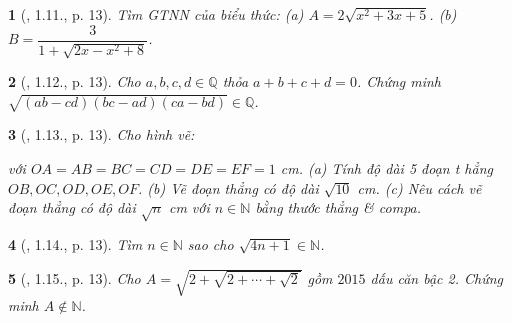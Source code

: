 \documentclass{article}
\newtheorem{baitoan}{}%
\begin{document}
\begin{baitoan}[\cite{Binh_boi_duong_Toan_9_tap_1}, 1.11., p. 13]
	Tìm {\rm GTNN} của biểu thức: (a) $A = 2\sqrt{x^2 + 3x + 5}$. (b) $B = \dfrac{3}{1 + \sqrt{2x - x^2 + 8}}$.
\end{baitoan}

\begin{baitoan}[\cite{Binh_boi_duong_Toan_9_tap_1}, 1.12., p. 13]
	Cho $a,b,c,d\in\mathbb{Q}$ thỏa $a + b + c + d = 0$. Chứng minh $\sqrt{(ab - cd)(bc - ad)(ca - bd)}\in\mathbb{Q}$.
\end{baitoan}

\begin{baitoan}[\cite{Binh_boi_duong_Toan_9_tap_1}, 1.13., p. 13]
	Cho hình vẽ:
	\begin{center}
	\end{center}
	với $OA = AB = BC = CD = DE = EF = 1$ {\rm cm}. (a) Tính độ dài 5 đoạn t hẳng $OB,OC,OD,OE,OF$. (b) Vẽ đoạn thẳng có độ dài $\sqrt{10}$ {\rm cm}. (c) Nêu cách vẽ đoạn thẳng có độ dài $\sqrt{n}$ {\rm cm} với $n\in\mathbb{N}$ bằng thước thẳng \& compa.
\end{baitoan}

\begin{baitoan}[\cite{Binh_boi_duong_Toan_9_tap_1}, 1.14., p. 13]
	Tìm $n\in\mathbb{N}$ sao cho $\sqrt{4n + 1}\in\mathbb{N}$.
\end{baitoan}

\begin{baitoan}[\cite{Binh_boi_duong_Toan_9_tap_1}, 1.15., p. 13]
	Cho $A = \sqrt{2 + \sqrt{2 + \cdots + \sqrt{2}}}$ gồm $2015$ dấu căn bậc 2. Chứng minh $A\notin\mathbb{N}$.
\end{baitoan}
\end{document}
